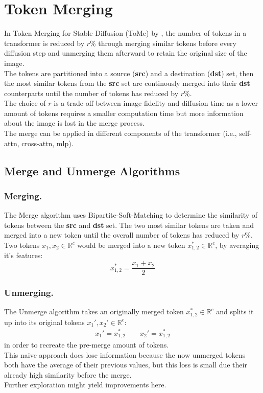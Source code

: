 \section{Token Merging}
In Token Merging for Stable Diffusion (ToMe) by \cite{bolya2023tomesd}, the number of tokens in a transformer is reduced by \(r\)\% through merging similar tokens before every diffusion step and unmerging them afterward to retain the original size of the image.\\
The tokens are partitioned into a source (\textbf{src}) and a destination (\textbf{dst}) set, then the most similar tokens from the \textbf{src} set are continously merged into their \textbf{dst} counterparts until the number of tokens has reduced by \(r\)\%.\\
The choice of \(r\) is a trade-off between image fidelity and diffusion time as a lower amount of tokens requires a smaller computation time but more information about the image is lost in the merge process.\\
The merge can be applied in different components of the transformer (i.e., self-attn, cross-attn, mlp).



\subsection{Merge and Unmerge Algorithms}
\subsubsection*{Merging.} The Merge algorithm uses Bipartite-Soft-Matching to determine the similarity of tokens between the \textbf{src} and \textbf{dst} set. The two most similar tokens are taken and merged into a new token until the overall number of tokens has reduced by \(r\%\).\\
Two tokens \(x_1, x_2 \in \mathbb{R}^c\) would be merged into a new token \(x_{1,2}^* \in \mathbb{R}^c \), by averaging it's features: \[x_{1,2}^* = \frac{x_1 + x_2}{2}\]



\subsubsection*{Unmerging.} The Unmerge algorithm takes an originally merged token $x_{1,2}^* \in \mathbb{R}^c$ and splits it up into its original tokens $x_1', x_2' \in \mathbb{R}^c$: 
\begin{align*}
    x_1' = x_{1,2}^* \quad\quad
    x_2' = x_{1,2}^*
\end{align*}
in order to recreate the pre-merge amount of tokens.\\
This naive approach does lose information because the now unmerged tokens both have the average of their previous values, but this loss is small due their already high similarity before the merge.\\ Further exploration might yield improvements here.



